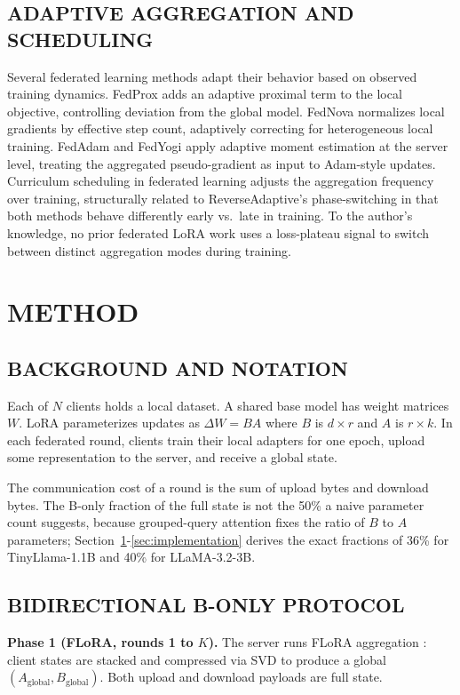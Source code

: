 \subsection{ADAPTIVE AGGREGATION AND SCHEDULING}
Several federated learning methods adapt their behavior based on observed training dynamics. FedProx \cite{li2020fedprox} adds an adaptive proximal term to the local objective, controlling deviation from the global model. FedNova \cite{wang2020fednova} normalizes local gradients by effective step count, adaptively correcting for heterogeneous local training. FedAdam and FedYogi \cite{reddi2020adaptive} apply adaptive moment estimation at the server level, treating the aggregated pseudo-gradient as input to Adam-style updates. Curriculum scheduling in federated learning adjusts the aggregation frequency over training, structurally related to ReverseAdaptive's phase-switching in that both methods behave differently early vs.\ late in training. To the author's knowledge, no prior federated LoRA work uses a loss-plateau signal to switch between distinct aggregation modes during training.

\section{METHOD}
\label{sec:method}

\subsection{BACKGROUND AND NOTATION}
Each of $N$ clients holds a local dataset. A shared base model has weight matrices $W$. LoRA \cite{hu2022lora} parameterizes updates as $\Delta W = BA$ where $B$ is $d \times r$ and $A$ is $r \times k$. In each federated round, clients train their local adapters for one epoch, upload some representation to the server, and receive a global state.

The communication cost of a round is the sum of upload bytes and download bytes. The B-only fraction of the full state is not the 50\% a naive parameter count suggests, because grouped-query attention fixes the ratio of $B$ to $A$ parameters; Section~\ref{sec:method}-\ref{sec:implementation} derives the exact fractions of 36\% for TinyLlama-1.1B and 40\% for LLaMA-3.2-3B.

\subsection{BIDIRECTIONAL B-ONLY PROTOCOL}
\textbf{Phase 1 (FLoRA, rounds 1 to $K$).}
The server runs FLoRA aggregation \cite{wang2024flora}: client states are stacked and compressed via SVD to produce a global $(A_{\text{global}}, B_{\text{global}})$. Both upload and download payloads are full state.

